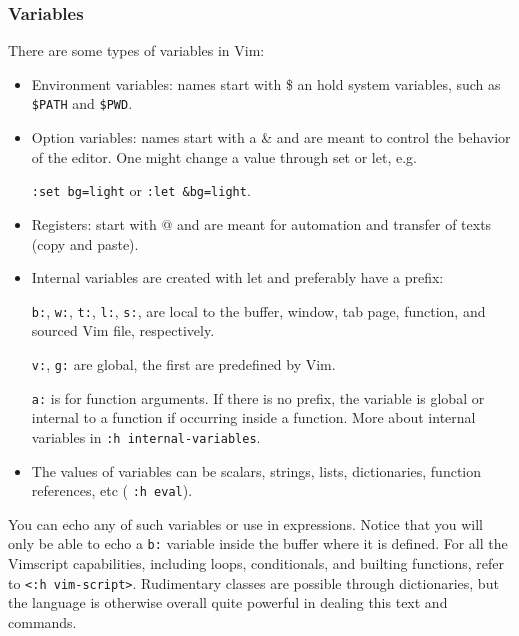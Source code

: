 \documentclass{article}
\newcommand{\ttt}[1] {
	\texttt{<#1>}}
\newcommand{\tttt}[1] {
	\texttt{#1}}
\begin{document}
\subsubsection{Variables}
There are some types of variables in Vim:
\begin{itemize}
	\item Environment variables: names start with \$ an hold system
		variables, such as \tttt{\$PATH} and \tttt{\$PWD}.
	\item Option variables: names start with a \& and are meant to control the behavior of the editor.
		One might change a value through set or let, e.g.
		\tttt{:set bg=light} or \tttt{:let \&bg=light}.
	\item Registers: start with @ and are meant for automation and transfer of texts (copy and paste).
	\item Internal variables are created with let and preferably have a prefix:
	\tttt{b:}, \tttt{w:}, \tttt{t:}, \tttt{l:}, \tttt{s:},
		are local to the buffer, window, tab page, function, and
		sourced Vim file, respectively.
 \tttt{v:}, \tttt{g:} are global, the first are predefined by Vim.
		\tttt{a:} is for function arguments.
		If there is no prefix, the variable is global or internal to a function if occurring inside a function.
		More about internal variables in \tttt{:h internal-variables}.
	\item The values of variables can be scalars, strings, lists, dictionaries, function references, etc (\tttt{:h eval}).
\end{itemize}
You can echo any of such variables or use in expressions.
Notice that you will only be able to echo a \tttt{b:} variable inside
the buffer where it is defined.
For all the Vimscript capabilities, including loops, conditionals,
and builting functions, refer to \ttt{:h vim-script}.
Rudimentary classes are possible through dictionaries,
but the language is otherwise overall quite powerful in
dealing this text and commands.
\end{document}
